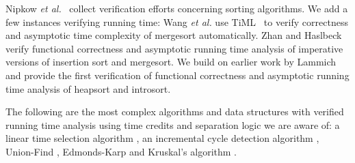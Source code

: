 \documentclass[acmsmall]{acmart}
\newcommand{\is}{\lstinline[language=isabelle]}
\begin{document}
Nipkow \emph{et al.}~\cite[\S 4.1]{NipkowEH-ATVA20} collect verification efforts concerning sorting algorithms.
We add a few instances verifying running time:
%
Wang \emph{et al.} use TiML~\cite{WangWC17} to verify correctness and asymptotic time complexity of mergesort automatically.
Zhan and Haslbeck \cite{zhan2018verifying} verify functional correctness and asymptotic running time analysis of imperative versions of insertion sort and mergesort.
We build on earlier work by Lammich~\cite{Lammich20} and provide the first verification of functional correctness and asymptotic running time analysis of heapsort and introsort.

The following are the most complex algorithms and data structures with verified running time analysis using time credits and separation logic we are aware of:
a linear time selection algorithm \cite{zhan2018verifying}, an incremental cycle detection algorithm \cite{gueneau-chargueraud-jourdan-pottier-19}, Union-Find \cite{ChargueraudP19}, Edmonds-Karp and Kruskal's algorithm \cite{HaslbeckL19}.



\end{document}
